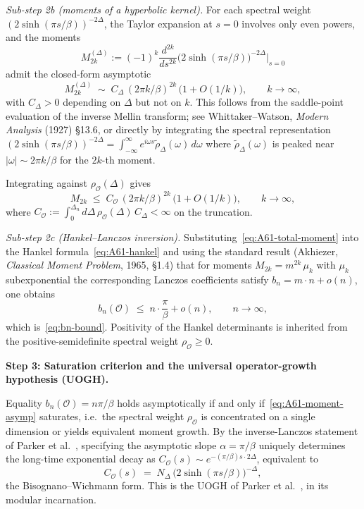 \documentclass[12pt,a4paper]{article}
\begin{document}
\emph{Sub-step 2b (moments of a hyperbolic kernel).}
For each spectral weight $(2\sinh(\pi s/\beta))^{-2\Delta}$, the
Taylor expansion at $s=0$ involves only even powers, and the moments
\[
  M_{2k}^{(\Delta)} := (-1)^k \frac{d^{2k}}{ds^{2k}}
  \bigl(2\sinh(\pi s/\beta)\bigr)^{-2\Delta}\Big|_{s=0}
\]
admit the closed-form asymptotic
\begin{equation}
  M_{2k}^{(\Delta)}
  \;\sim\;
  C_\Delta \,(2\pi k/\beta)^{2k}
  \,\bigl(1 + O(1/k)\bigr),
  \qquad k\to\infty,
  \label{eq:A61-moment-asymp}
\end{equation}
with $C_\Delta > 0$ depending on $\Delta$ but not on $k$.
This follows from the saddle-point evaluation of the inverse Mellin
transform; see Whittaker--Watson, \emph{Modern Analysis} (1927) \S 13.6,
or directly by integrating the spectral representation
$(2\sinh(\pi s/\beta))^{-2\Delta} = \int_{-\infty}^\infty e^{i\omega s}
\tilde\rho_\Delta(\omega)\,d\omega$ where $\tilde\rho_\Delta(\omega)$
is peaked near $|\omega| \sim 2\pi k/\beta$ for the $2k$-th moment.

Integrating against $\rho_\mathcal{O}(\Delta)$ gives
\begin{equation}
  M_{2k} \;\le\; C_\mathcal{O}\,(2\pi k/\beta)^{2k}
  \,\bigl(1 + O(1/k)\bigr),
  \qquad k\to\infty,
  \label{eq:A61-total-moment}
\end{equation}
where $C_\mathcal{O} := \int_0^{\Delta_n}d\Delta\,\rho_\mathcal{O}(\Delta)
\,C_\Delta < \infty$ on the truncation.

\emph{Sub-step 2c (Hankel--Lanczos inversion).}
Substituting~\eqref{eq:A61-total-moment} into the Hankel
formula~\eqref{eq:A61-hankel} and using the standard result (Akhiezer,
\emph{Classical Moment Problem}, 1965, \S 1.4) that for moments
$M_{2k} = m^{2k}\,\mu_k$ with $\mu_k$ subexponential the corresponding
Lanczos coefficients satisfy $b_n = m\cdot n + o(n)$, one obtains
\begin{equation}
  b_n(\mathcal{O}) \;\le\; n\cdot \frac{\pi}{\beta} + o(n),
  \qquad n \to \infty,
\end{equation}
which is~\eqref{eq:bn-bound}. Positivity of the Hankel determinants
is inherited from the positive-semidefinite spectral weight
$\rho_\mathcal{O} \ge 0$.

\medskip

\noindent\textbf{Step 3: Saturation criterion and the universal
operator-growth hypothesis (UOGH).}

Equality $b_n(\mathcal{O}) = n\pi/\beta$ holds asymptotically if and
only if~\eqref{eq:A61-moment-asymp} saturates, i.e.\ the spectral
weight $\rho_\mathcal{O}$ is concentrated on a single dimension or
yields equivalent moment growth. By the inverse-Lanczos statement of
Parker et al.~\cite[Theorem~2]{Parker2019}, specifying the asymptotic
slope $\alpha = \pi/\beta$ uniquely determines the long-time exponential
decay as $C_\mathcal{O}(s) \sim e^{-(\pi/\beta) s\cdot 2\Delta}$,
equivalent to
\begin{equation}
  C_\mathcal{O}(s)
  \;=\;
  N_\Delta\,\bigl(2\sinh(\pi s/\beta)\bigr)^{-\Delta},
  \label{eq:A61-bw-twopt-sat}
\end{equation}
the Bisognano--Wichmann form. This is the UOGH of Parker et
al.~\cite{Parker2019}, in its modular incarnation.
\end{document}
